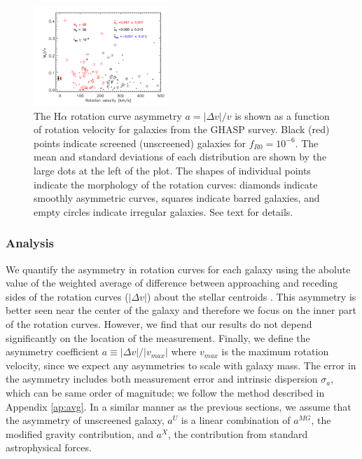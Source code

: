 \documentclass{emulateapj}
\newcommand{\ha}{H$\alpha$}
\begin{document}
\begin{figure}
\begin{center}
\includegraphics[trim= 3cm 0cm 0cm 0cm, clip = true, width=0.45\textwidth]
{figures/GHASP2.png}
\caption{The  \ha{} rotation curve asymmetry $a=|\Delta v|/v$ is shown as a
function of rotation velocity for  galaxies from the GHASP survey. Black (red) points
indicate screened (unscreened) galaxies for $f_{R0}=10^{-6}$.
The mean and standard deviations of each distribution are shown by the large
dots at the left of the plot. The shapes of individual points indicate the 
morphology of the rotation curves: diamonds indicate smoothly asymmetric
curves, squares indicate barred galaxies, and empty circles indicate irregular
galaxies.  See  text for details.
\label{fig:plotsGHASP}}
\end{center}
\end{figure}


\subsubsection{Analysis}
We quantify the asymmetry in rotation curves for each galaxy
using the abolute value of the weighted average of difference between
approaching and receding sides of the rotation curves ($|\Delta v|$) about the
stellar centroids \citep{epinat08a}. This asymmetry is better seen near the
center of the galaxy and therefore we focus on the inner part of the
rotation curves. However, we find that our results do not depend
significantly on the location of the measurement. Finally, we define the
asymmetry coefficient $a \equiv |\Delta v| / |v_{max}|$ where $v_{max}$ is the
maximum rotation velocity, since we expect any asymmetries to scale with
galaxy mass.
The error in the asymmetry
includes both measurement error and intrinsic dispersion $\sigma_a$, which
can be same order of magnitude; we follow the method described in Appendix
\ref{ap:avg}. In a similar manner as the previous sections, we assume that
the asymmetry of unscreened galaxy, $a^U$ is a linear combination of
$a^{MG}$, the modified gravity contribution, and $a^X$, the contribution from
standard astrophysical forces.
\end{document}
